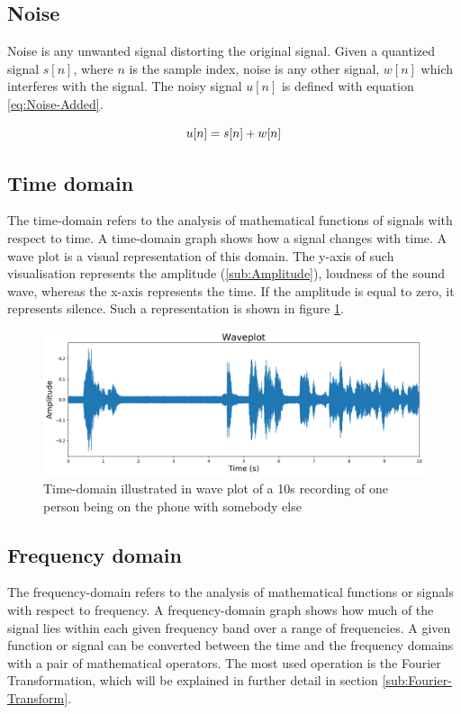 \subsection{Noise}
\label{sub:Noise}
Noise is any unwanted signal distorting the original signal. Given a quantized signal $s[n]$, where $n$ is the sample index, noise is any other signal, $w[n]$ which interferes with the signal. The noisy signal $u[n]$ is defined with equation \ref{eq:Noise-Added}.

\begin{equation}
    \centering
    u[n] = s[n] + w[n]
    \label{eq:Noise-Added}
\end{equation}

\subsection{Time domain}
\label{sub:Time-Domain}
The time-domain refers to the analysis of mathematical functions of signals with respect to time. A time-domain graph shows how a signal changes with time. 
\newline
\newline
A wave plot is a visual representation of this domain. The y-axis of such visualisation represents the amplitude (\ref{sub:Amplitude}), loudness of the sound wave, whereas the x-axis represents the time. If the amplitude is equal to zero, it represents silence. Such a representation is shown in figure \ref{fig:Waveplot-Time-Domain}.
\begin{figure}[htbp]
	\centering
	\includegraphics[scale=0.45]{img/raw_waveform.png}
	\caption{Time-domain illustrated in wave plot of a 10s recording of one person being on the phone with somebody else}
	\label{fig:Waveplot-Time-Domain}
\end{figure}

\subsection{Frequency domain}
\label{sub:Frequency-Domain}
The frequency-domain refers to the analysis of mathematical functions or signals with respect to frequency. A frequency-domain graph shows how much of the signal lies within each given frequency band over a range of frequencies. 
\newline
\newline
A given function or signal can be converted between the time and the frequency domains with a pair of mathematical operators. The most used operation is the Fourier Transformation, which will be explained in further detail in section \ref{sub:Fourier-Transform}.

